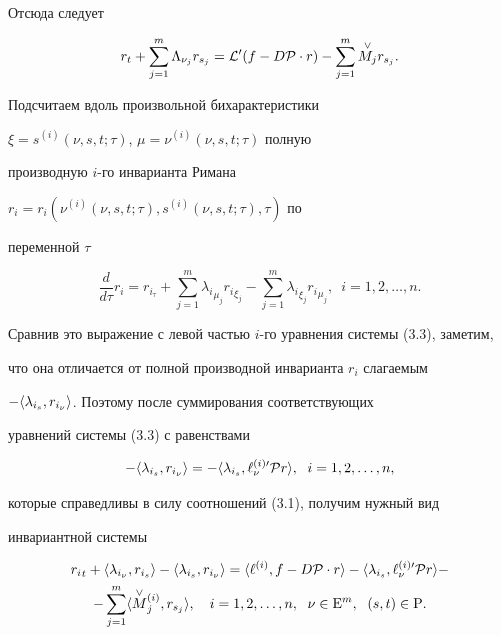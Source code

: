 Отсюда следует


\begin{equation}


r_t+\sum_{j=1}^m \Lambda_{\nu_j} r_{s_j}={\cal L}^{\prime} 


(f - D {\cal P} \cdot r) - \sum_{j=1}^m \up{\vee}{M_j} r_{s_j}.


\end{equation}


Подсчитаем вдоль произвольной бихарактеристики 


$\xi=s^{(i)}(\nu,s,t;\tau)$, $\mu=\nu^{(i)}(\nu,s,t;\tau)$ полную 


производную $i$-го инварианта Римана 


$r_i=r_i ( \nu^{(i)}(\nu,s,t;\tau), s^{(i)}(\nu,s,t;\tau),\tau)$ по


переменной $\tau$


\begin{equation}


\frac{d}{d\tau}r_i=r_{i_\tau}+\sum_{j=1}^m {\lambda_i}_{\mu_j} 


{r_i}_{\xi_j} - \sum_{j=1}^m {\lambda_i}_{\xi_j} {r_i}_{\mu_j},


\ \; i=1,2,\dotsc,n.


\end{equation}


Сравнив это выражение с левой частью $i$-го уравнения системы (3.3), заметим,


что она отличается от полной производной инварианта $r_i$ слагаемым 


$-\langle\lambda_{i_s}, r_{i_\nu}\rangle$. Поэтому после суммирования соответствующих 


уравнений системы (3.3) с равенствами


$$


- \la\lambda_{i_s}, r_{i_\nu}\ra=


- \la\lambda_{i_s},\ell^{(i)\prime}_\nu {\cal P} r\ra,\ \; i=1,2,\dotsc,n,


$$


которые справедливы в силу соотношений (3.1), получим нужный вид 


инвариантной системы


\begin{multline}


{r_i}_t+\la\lambda_{i_\nu}, r_{i_s}\ra - \la\lambda_{i_s}, r_{i_\nu}\ra=


\la\ell^{(i)}, f - D{\cal P} \cdot r\ra - 


\la\lambda_{i_s},\ell^{(i)\prime}_\nu {\cal P} r\ra -\\


%


- \sum_{j=1}^m \la \up{\vee}{M}_{j}^{(i)}, r_{s_j}\ra, \quad


i=1,2,\dotsc,n,\ \; \nu \in {\mathrm E}^m,\ \; (s,t) \in {\mathrm P}.


\end{multline}


